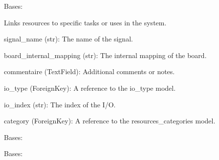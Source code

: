 \documentclass[letterpaper,10pt,english]{sphinxmanual}
\begin{document}

\begin{fulllineitems}
\label{\detokenize{app:app.models.assigned_resources}}
\pysigstartsignatures
{}
\pysigstopsignatures
\sphinxAtStartPar
Bases: 

\sphinxAtStartPar
Links resources to specific tasks or uses in the system.
\begin{description}
\sphinxAtStartPar
signal\_name (str): The name of the signal.

\sphinxAtStartPar
board\_internal\_mapping (str): The internal mapping of the board.

\sphinxAtStartPar
commentaire (TextField): Additional comments or notes.

\sphinxAtStartPar
io\_type (ForeignKey): A reference to the io\_type model.

\sphinxAtStartPar
io\_index (str): The index of the I/O.

\sphinxAtStartPar
category (ForeignKey): A reference to the resources\_categories model.

\end{description}

\begin{fulllineitems}
\label{\detokenize{app:app.models.assigned_resources.DoesNotExist}}
\pysigstartsignatures
{}
\pysigstopsignatures
\sphinxAtStartPar
Bases: 

\end{fulllineitems}


\begin{fulllineitems}
\label{\detokenize{app:app.models.assigned_resources.MultipleObjectsReturned}}
\pysigstartsignatures
{}
\pysigstopsignatures
\sphinxAtStartPar
Bases: 


\end{fulllineitems}
\end{fulllineitems}
\end{document}
